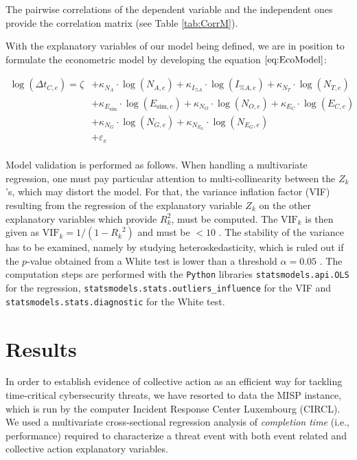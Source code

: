 \documentclass[unnumsec,webpdf,contemporary,large]{oup-authoring-template}%
\theoremstyle{thmstyleone}%
\theoremstyle{thmstyletwo}%
\theoremstyle{thmstylethree}%
\begin{document}
The pairwise correlations of the dependent variable and the independent ones provide the correlation matrix (see Table \ref{tab:CorrM}).

With the explanatory variables of our model being defined, we are in position to formulate the econometric model by developing the equation $\eqref{eq:EcoModel}$:

\begin{align}
    \log(\Delta t_{C,e}) = \zeta &+ \kappa_{N_A} \cdot \log(N_{A,e}) + \kappa_{I_{\%A}} \cdot \log(I_{\%A, e}) + \kappa_{N_T} \cdot \log(N_{T,e}) \nonumber\\ 
    &+ \kappa_{E_\textrm{sim}} \cdot \log(E_{\textrm{sim},e}) + \kappa_{N_O} \cdot \log(N_{O,e}) + \kappa_{E_C} \cdot \log(E_{C,e}) \nonumber\\
    &+ \kappa_{N_G} \cdot \log(N_{G,e}) + \kappa_{N_{E_G}} \cdot \log(N_{E_G,e}) \nonumber\\
    &+ \varepsilon_e 
\label{eq:OLS1}
\end{align}\\


    
    
    Model validation is performed as follows. When handling a multivariate regression, one must pay particular attention to  multi-collinearity between the $Z_k$'s, which may distort the model. For that, the variance inflation factor (VIF) resulting from the regression of the explanatory variable $Z_k$ on the other explanatory variables which provide $R_{k}^2$, must be computed. The $\textrm{VIF}_k$ is then given as $\textrm{VIF}_k = 1/(1-{R_k}^2)$ and must be $< 10$ \cite{asteriou_applied_2015}. The stability of the variance has to be examined, namely by studying heteroskedasticity, which is ruled out if the $p$-value obtained from a White test is lower than a threshold $\alpha = 0.05$ \cite{asteriou_applied_2015}. The computation steps are performed with the \verb?Python? libraries \verb?statsmodels.api.OLS? for the regression, \verb?statsmodels.stats.outliers_influence? for the VIF and \verb?statsmodels.stats.diagnostic? for the White test.

\section{Results}
\label{sec:results}
In order to establish evidence of collective action as an efficient way for tackling time-critical cybersecurity threats, we have resorted to data the MISP instance, which is run by the computer Incident Response Center Luxembourg (CIRCL). We used  a multivariate cross-sectional regression analysis of {\it completion time} (i.e., performance) required to characterize a threat event with both event related and collective action explanatory variables. 
\end{document}
